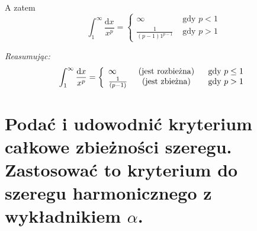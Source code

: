 \documentclass{article}
\theoremstyle{definition}
\theoremstyle{case}
\begin{document}
A zatem
\begin{equation*}
	\int_1^\infty \frac{\mathrm{d}x}{x^p}
	= \left\{
		\begin{array}{ll}
			\infty & \text{ gdy } p< 1
			\\ \frac{1}{(p-1)1^{p-1}} & \text{ gdy } p> 1
		\end{array}
	\right. %
\end{equation*}

\textit{Reasumując:}
\begin{equation*}
	\int_1^\infty \frac{\mathrm{d}x}{x^p}
	= \left\{
		\begin{array}{lcl}
			\infty & \textnormal{ (jest rozbieżna) } & \text{ gdy } p\leq1
			\\ \frac{1}{(p-1)} & \textnormal{ (jest zbieżna) } & \text{ gdy } p>1
		\end{array}
	\right. %
\end{equation*}

\section{Podać i udowodnić kryterium całkowe zbieżności szeregu.
	Zastosować to kryterium do szeregu harmonicznego z wykładnikiem
	\texorpdfstring{$ \alpha $}{a}.
}
\end{document}
